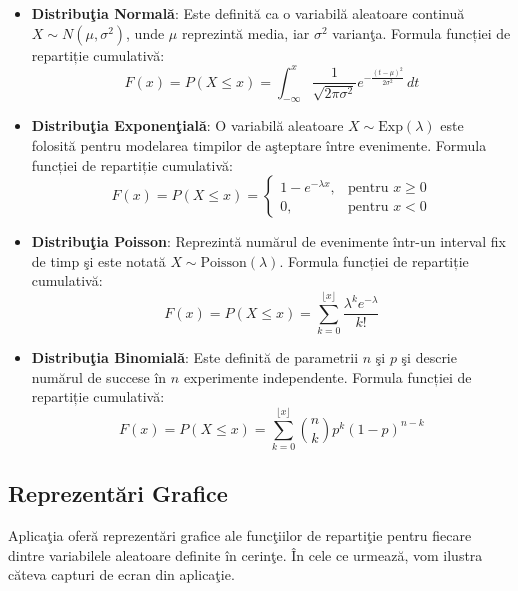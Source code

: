 \documentclass[a4paper,11pt]{article}
\begin{document}
\begin{itemize}
  \item \textbf{Distribu\c{t}ia Normal\u{a}}: Este definit\u{a} ca o variabil\u{a} aleatoare continu\u{a} $X \sim N(\mu, \sigma^2)$, unde $\mu$ reprezint\u{a} media, iar $\sigma^2$ varian\c{t}a.
  \newline
  Formula funcției de repartiție cumulativă:
  \[
  F(x) = P(X \leq x) = \int_{-\infty}^{x} \frac{1}{\sqrt{2\pi \sigma^2}} e^{-\frac{(t - \mu)^2}{2\sigma^2}} \, dt
  \]

  \item \textbf{Distribu\c{t}ia Exponen\c{t}ial\u{a}}: O variabil\u{a} aleatoare $X \sim \text{Exp}(\lambda)$ este folosit\u{a} pentru modelarea timpilor de a\c{s}teptare între evenimente.
  \newline
  Formula funcției de repartiție cumulativă:
  \[
  F(x) = P(X \leq x) = 
  \begin{cases}
  1 - e^{-\lambda x}, & \text{pentru } x \geq 0 \\
  0, & \text{pentru } x < 0
  \end{cases}
  \]

  \item \textbf{Distribu\c{t}ia Poisson}: Reprezint\u{a} num\u{a}rul de evenimente într-un interval fix de timp \c{s}i este notat\u{a} $X \sim \text{Poisson}(\lambda)$.
  \newline
  Formula funcției de repartiție cumulativă:
  \[
  F(x) = P(X \leq x) = \sum_{k=0}^{\lfloor x \rfloor} \frac{\lambda^k e^{-\lambda}}{k!}
  \]

  \item \textbf{Distribu\c{t}ia Binomial\u{a}}: Este definit\u{a} de parametrii $n$ \c{s}i $p$ \c{s}i descrie num\u{a}rul de succese în $n$ experimente independente.
  \newline
  Formula funcției de repartiție cumulativă:
  \[
  F(x) = P(X \leq x) = \sum_{k=0}^{\lfloor x \rfloor} \binom{n}{k} p^k (1 - p)^{n - k}
  \]
\end{itemize}

\newpage

\subsection*{Reprezent\u{a}ri Grafice}

Aplica\c{t}ia ofer\u{a} reprezent\u{a}ri grafice ale func\c{t}iilor de reparti\c{t}ie pentru fiecare dintre variabilele aleatoare definite în cerin\c{t}e. În cele ce urmeaz\u{a}, vom ilustra c\u{a}teva capturi de ecran din aplica\c{t}ie.
\end{document}

